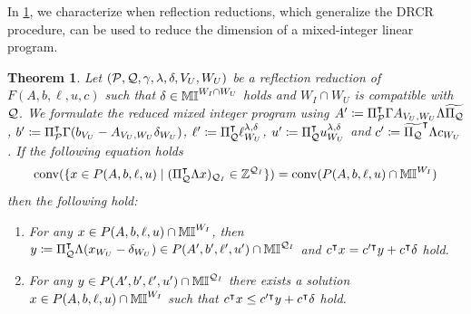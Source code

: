 \documentclass[pdflatex,sn-mathphys-num]{sn-jnl}%
\theoremstyle{thmstyleone}%
\newtheorem{theorem}[theorem]{Theorem}
\theoremstyle{thmstylethree}%
\theoremstyle{thmstyletwo}%
\newcommand{\conv}{\mathrm{conv}}
\begin{document}
In \cref{thm_milp_folding}, we characterize when reflection reductions, which generalize the DRCR procedure, can be used to reduce the dimension of a mixed-integer linear program.
\begin{theorem}
    \label{thm_milp_folding}
    Let $(\mathcal{P},\mathcal{Q},\gamma,\lambda,\delta,V_U,W_U)$ be a reflection reduction of $F(A,b,\ell,u,c)$ such that $\delta\in \mathbb{MI}^{W_I\cap W_U}$ holds and $W_I \cap W_U$ is compatible with $\mathcal{Q}$. We formulate the reduced mixed integer program using $A'\coloneqq \transpose{\Pi_{\MP}}\Gamma A_{V_U,W_U}\Lambda \widetilde{\Pi_{\MQ}}$, $b'\coloneqq \transpose{\Pi_{\MP}}\Gamma(b_{V_U} - A_{V_U,W_U} \delta_{W_U})$, $\ell' \coloneqq \transpose{\Pi_{\MQ}} \ell^{\lambda,\delta}_{W_U}$, $u'\coloneqq  \transpose{\Pi_{\MQ}} u^{\lambda,\delta}_{W_U}$ and $c'\coloneqq \transpose{\widetilde{\Pi_\MQ}} \Lambda c_{W_U}$.
    If the following equation holds
    \begin{equation}
        \label{thm_milp_folding_condition}
        \conv(\{x\in P(A,b,\ell,u) \mid (\transpose{\Pi_{\MQ}} \Lambda x)_{\MQ_I} \in \Z^{\MQ_I}\}) = \conv(P(A,b,\ell,u)\cap \M^{W_I})
    \end{equation}
    then the following hold:
    \begin{enumerate}[label=(\roman*)]
        \item \label{thm_milp_folding_to_red} For any $x\in P(A,b,\ell,u)\cap \mathbb{MI}^{W_I}$, then $y\coloneqq \transpose{\Pi_{\MQ}} \Lambda (x_{W_U}-\delta_{W_U}) \in P(A',b',\ell',u')\cap \M^{\MQ_{I}}$ and $c^{\intercal} x = c'^{\intercal} y + c^{\intercal} \delta$ hold.
        \item \label{thm_milp_folding_from_red} For any $y\in P(A',b',\ell',u') \cap \mathbb{MI}^{\mathcal{Q}_{I}}$ there exists a solution $x\in P(A,b,\ell,u) \cap \mathbb{MI}^{W_I}$ such that $c^{\intercal} x \leq c'^{\intercal} y + c^{\intercal} \delta$ hold. 
    \end{enumerate}    
\end{theorem}
\end{document}
